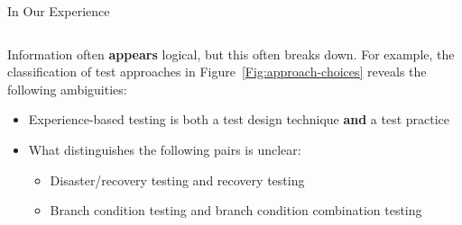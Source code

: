 \documentclass[22pt]{beamer}
\begin{document}
\begin{frame}[fragile]
\begin{textblock}{7.25}
\begin{block}{\fontsize{37}{20}\selectfont In Our Experience}
\begin{columns}
\begin{column}{0.25\textwidth}
                    Information often \textbf{appears} logical, but this often
                    breaks down. For example, the classification of test
                    approaches in Figure~\ref{Fig:approach-choices} reveals the
                    following ambiguities:
                    \begin{itemize}
                        \item Experience-based testing is both a test design
                              technique \textbf{and} a test practice
                        \item What distinguishes the following pairs is unclear:
                              \begin{itemize}
                                  \item Disaster/recovery testing and recovery
                                        testing
                                  \item Branch condition testing and branch
                                        condition combination testing
                              \end{itemize}
                    \end{itemize}
                \end{column}
            \end{columns}
        \end{block}
    \end{textblock}


\end{frame}
\end{document}
